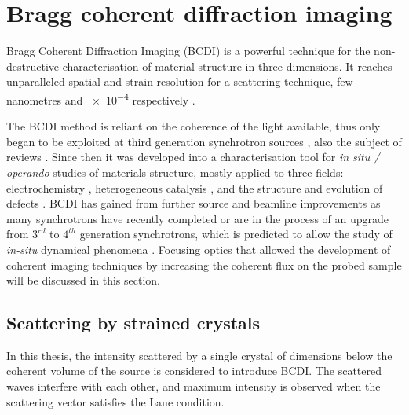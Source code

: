 \section{Bragg coherent diffraction imaging} \label{sec:BCDI}

Bragg Coherent Diffraction Imaging (BCDI) \parencite{Robinson2001, Pfeifer2006, Robinson2009} is a powerful technique for the non-destructive characterisation of material structure in three dimensions.
It reaches unparalleled spatial and strain resolution for a scattering technique, few nanometres \parencite{Labat2015, Cherukara2018a} and \num{e-4} respectively \parencite{Newton2010, Lauraux2020}.

The BCDI method is reliant on the coherence of the light available, thus only began to be exploited at third generation synchrotron sources \parencite{Miao1999, Miao2000, Robinson2001, Labat2007, Robinson2009, Vaxelaire2010, Chamard2010, Clark2012, Clark2013, Yang2013, Xiong2014}, also the subject of reviews \parencite{Nugent2010, Miao2015}.
Since then it was developed into a characterisation tool for \textit{in situ / operando} studies of materials structure, mostly applied to three fields: electrochemistry \parencite{Ulvestad2015}, heterogeneous catalysis \parencite{Ulvestad2016}, and the structure and evolution of defects \parencite{Labat2015}.
BCDI has gained from further source and beamline improvements as many synchrotrons have recently completed or are in the process of an upgrade from $3^{rd}$ to $4^{th}$ generation synchrotrons, which is predicted to allow the study of \textit{in-situ} dynamical phenomena \parencite{Lo2018}.
Focusing optics that allowed the development of coherent imaging techniques by increasing the coherent flux on the probed sample will be discussed in this section.

\subsection{Scattering by strained crystals}\label{sec:StrainBCDI}

In this thesis, the intensity scattered by a single crystal of dimensions below the coherent volume of the source is considered to introduce BCDI.
The scattered waves interfere with each other, and maximum intensity is observed when the scattering vector satisfies the Laue condition.

